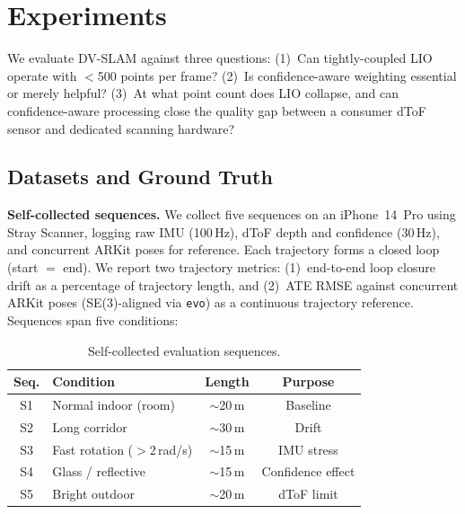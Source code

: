 \documentclass[journal]{IEEEtran}
\begin{document}
\section{Experiments}
\label{sec:experiments}

We evaluate DV-SLAM against three questions: (1)~Can tightly-coupled LIO operate with $<$500 points per frame? (2)~Is confidence-aware weighting essential or merely helpful? (3)~At what point count does LIO collapse, and can confidence-aware processing close the quality gap between a consumer dToF sensor and dedicated scanning hardware?

\subsection{Datasets and Ground Truth}
\label{sec:datasets}

\textbf{Self-collected sequences.}
We collect five sequences on an iPhone~14~Pro using Stray Scanner, logging raw IMU (100\,Hz), dToF depth and confidence (30\,Hz), and concurrent ARKit poses for reference. Each trajectory forms a closed loop (start $=$ end). We report two trajectory metrics: (1)~end-to-end loop closure drift as a percentage of trajectory length, and (2)~ATE RMSE against concurrent ARKit poses (SE(3)-aligned via \texttt{evo}) as a continuous trajectory reference. Sequences span five conditions:

\begin{table}[t]
    \centering
    \caption{Self-collected evaluation sequences.}
    \label{tab:sequences}
    \setlength{\tabcolsep}{4pt}
    \begin{tabular}{clcc}
        \toprule
        Seq. & Condition & Length & Purpose \\
        \midrule
        S1 & Normal indoor (room) & ${\sim}$20\,m & Baseline \\
        S2 & Long corridor & ${\sim}$30\,m & Drift \\
        S3 & Fast rotation ($>$2\,rad/s) & ${\sim}$15\,m & IMU stress \\
        S4 & Glass / reflective & ${\sim}$15\,m & Confidence effect \\
        S5 & Bright outdoor & ${\sim}$20\,m & dToF limit \\
        \bottomrule
    \end{tabular}
\end{table}
\end{document}
